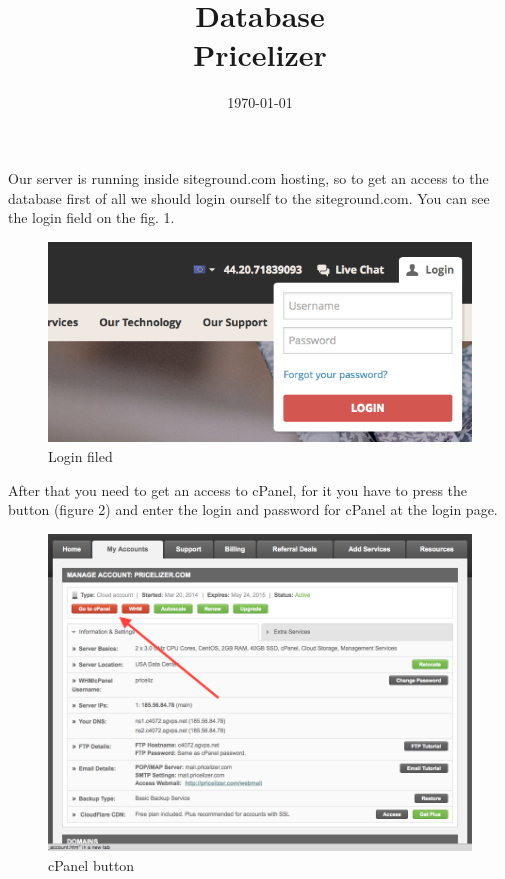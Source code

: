 \documentclass[english]{article}
\date{}
\begin{document}
\title{\vspace{3in}Database\\
\small Pricelizer\\
}

\nopagebreak
\maketitle


\vspace{4in}



\date{\today}
\thispagestyle{empty}

\newpage
\setcounter{page}{1}
\setcounter{tocdepth}{2}

\newpage



Our server is running inside siteground.com hosting, so to get an access to the database first of all we should login ourself to the siteground.com.
You can see the login field on the fig. 1.

\begin{figure}[H]
\centerline{\includegraphics[scale=0.35]{PDatabase/sg}}
\caption{Login filed}
\end{figure}

After that you need to get an access to cPanel, for it you have to press the button (figure 2) and enter the login and password for cPanel at the login page.
\begin{figure}[H]
\centerline{\includegraphics[scale=0.35]{PDatabase/cp}}
\caption{cPanel button}
\end{figure}
\end{document}
